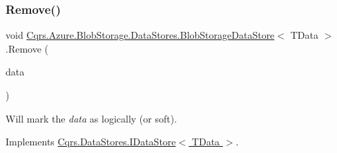 \subsubsection{\texorpdfstring{Remove()}{Remove()}}
{\footnotesize\ttfamily void \hyperlink{classCqrs_1_1Azure_1_1BlobStorage_1_1DataStores_1_1BlobStorageDataStore}{Cqrs.\+Azure.\+Blob\+Storage.\+Data\+Stores.\+Blob\+Storage\+Data\+Store}$<$ T\+Data $>$.Remove (\begin{DoxyParamCaption}\item[{T\+Data}]{data }\end{DoxyParamCaption})}



Will mark the {\itshape data}  as logically (or soft). 



Implements \hyperlink{interfaceCqrs_1_1DataStores_1_1IDataStore_a7ef540796bbe4257296841590bc23478_a7ef540796bbe4257296841590bc23478}{Cqrs.\+Data\+Stores.\+I\+Data\+Store$<$ T\+Data $>$}.

